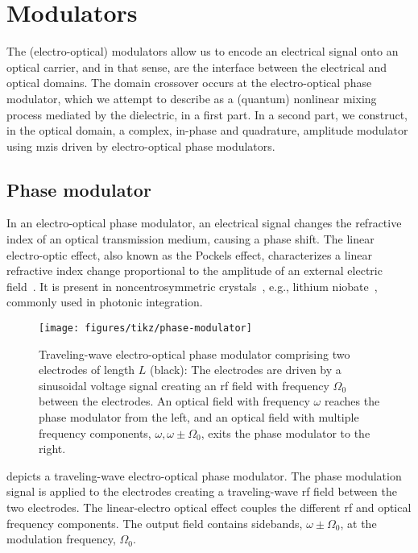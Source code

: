 \section{Modulators}

The (electro-optical) modulators allow us to encode an electrical signal onto an optical carrier, and in that sense, are the interface between the electrical and optical domains.
The domain crossover occurs at the electro-optical phase modulator, which we attempt to describe as a (quantum) nonlinear mixing process mediated by the dielectric, in a first part.
In a second part, we construct, in the optical domain, a complex, in-phase and quadrature, amplitude modulator using \gls{mzi}s driven by electro-optical phase modulators.

\subsection{Phase modulator}

In an electro-optical phase modulator, an electrical signal changes the refractive index of an optical transmission medium, causing a phase shift.
The linear electro-optic effect, also known as the Pockels effect, characterizes a linear refractive index change proportional to the amplitude of an external electric field~\cite[Ch.~18]{Saleh2007}.
It is present in noncentrosymmetric crystals~\cite[p.~2]{Boyd2020}, e.g., lithium niobate~\cite[p.~237]{Yariv1984}, commonly used in photonic integration.
\begin{figure}[htb]
    \centering
    \texttt{[image: figures/tikz/phase-modulator]}
    \caption{Traveling-wave electro-optical phase modulator comprising two electrodes of length $L$ (black): The electrodes are driven by a sinusoidal voltage signal creating an \gls{rf} field with frequency $\Omega_0$ between the electrodes. An optical field with frequency $\omega$ reaches the phase modulator from the left, and an optical field with multiple frequency components, $\omega,\omega\pm\Omega_0$, exits the phase modulator to the right.}\label{fig:phase_modulator}
\end{figure}
 depicts a traveling-wave electro-optical phase modulator.
The phase modulation signal is applied to the electrodes creating a traveling-wave \gls{rf} field between the two electrodes.
The linear-electro optical effect couples the different \gls{rf} and optical frequency components.
The output field contains sidebands, $\omega\pm\Omega_0$, at the modulation frequency, $\Omega_0$.

